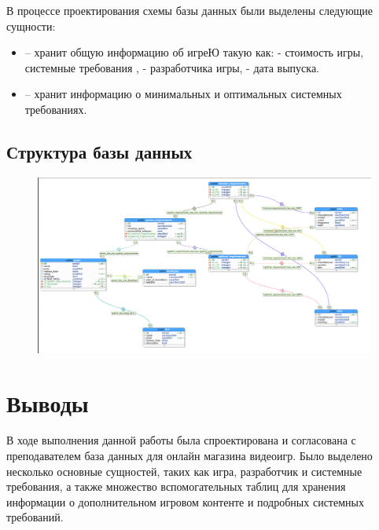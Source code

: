 В процессе проектирования схемы базы данных были выделены следующие сущности:
\begin{itemize}
	\item {} -- хранит общую информацию об игреЮ такую как:  - стоимость игры, системные требования ,  - разработчика игры,  - дата выпуска.
	
	\item {} -- хранит информацию о минимальных  и оптимальных  системных требованиях.
\end{itemize}
	

\subsection{Структура базы данных}

\begin{figure}[H]
	\centering
	\includegraphics[width=\linewidth]{../pics/scheme.png}
\end{figure}

\section{Выводы}

В ходе выполнения данной работы была спроектирована и согласована с преподавателем база данных для онлайн магазина видеоигр. Было выделено несколько основные сущностей, таких как игра, разработчик и системные требования, а также множество вспомогательных таблиц для хранения информации о дополнительном игровом контенте и подробных системных требований.

